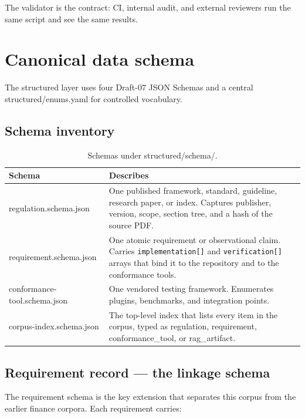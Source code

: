 \documentclass[11pt,a4paper,twoside]{report}
\newcommand{\corpus}{}
\newcommand{\tool}{}
\begin{document}
The validator is the contract: CI, internal audit, and external reviewers
run the same script and see the same results.
\clearpage
\chapter{Canonical data schema}
\label{ch:schema}

The structured layer uses four Draft-07 JSON Schemas and a central
\corpus{structured/enums.yaml} for controlled vocabulary.

\section{Schema inventory}

\begin{table}[h]
\centering
\small
\begin{tabularx}{\textwidth}{p{5.2cm}X}
\toprule
\textbf{Schema} & \textbf{Describes} \\
\midrule
\tool{regulation.schema.json}        & One published framework, standard, guideline, research paper, or index. Captures publisher, version, scope, section tree, and a hash of the source PDF. \\
\tool{requirement.schema.json}       & One atomic requirement or observational claim. Carries \texttt{implementation[]} and \texttt{verification[]} arrays that bind it to the repository and to the conformance tools. \\
\tool{conformance-tool.schema.json}  & One vendored testing framework. Enumerates plugins, benchmarks, and integration points. \\
\tool{corpus-index.schema.json}      & The top-level index that lists every item in the corpus, typed as regulation, requirement, conformance\_tool, or rag\_artifact. \\
\bottomrule
\end{tabularx}
\caption{Schemas under \corpus{structured/schema/}.}
\label{tab:schemas}
\end{table}

\section{Requirement record --- the linkage schema}

The requirement schema is the key extension that separates this corpus
from the earlier finance corpora. Each requirement carries:
\end{document}
